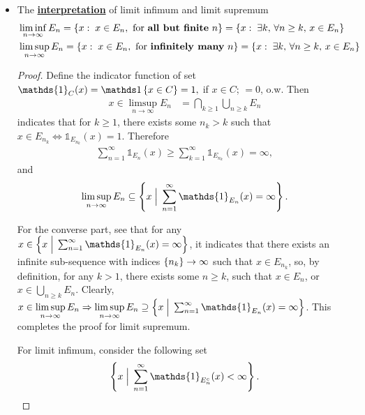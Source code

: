 \documentclass[11pt]{article}
\begin{document}
\begin{itemize}
\item \begin{proposition} The \underline{\textbf{interpretation}} of limit infimum and limit supremum
\begin{align*}
&\liminf\limits_{n\rightarrow \infty}E_{n} = \left\{x: \; x\in E_{n}, \text{ for \textbf{all but finite} }n \right\} = \left\{x: \; \exists k,\, \forall n\ge k, \, x\in E_{n} \right\}\\
&\limsup\limits_{n\rightarrow \infty}E_{n} = \left\{x: \; x\in E_{n}, \text{ for \textbf{infinitely many} }n \right\}  = \left\{x: \; \exists k,\, \forall n\ge k, \, x\in E_{n} \right\}
\end{align*}
\end{proposition}
\begin{proof}
Define the indicator function of set $\mathds{1}_{C}(x) = \ind{x\in C} = 1, $ if $x\in C$; $=0$, o.w. 
Then 
\begin{align*}
x\in \limsup\limits_{n\rightarrow \infty}E_{n} &= \bigcap_{k\ge 1}\bigcup_{n\ge k}E_{n}
\end{align*} 
indicates that for $k\ge 1$, there exists some $n_{k} > k$ such that $x\in E_{n_{k}} \Leftrightarrow  \mathds{1}_{E_{n_{k}}}(x)=1$. 
Therefore 
\begin{align*}
\sum_{n=1}^{\infty}\mathds{1}_{E_{n}}(x) \ge \sum_{k=1}^{\infty}\mathds{1}_{E_{n_{k}}}(x) = \infty,  
\end{align*} 
and 
\begin{align*}
\limsup\limits_{n\rightarrow \infty}E_{n} \subseteq \set{x\;\Big|\; \sum_{n=1}^{\infty}\mathds{1}_{E_{n}}(x)  = \infty}.
\end{align*}

For the converse part, see that for any $x \in \set{x\;\Big|\; \sum_{n=1}^{\infty}\mathds{1}_{E_{n}}(x)  = \infty}$, it indicates that there exists an infinite sub-sequence with indices $\left\{n_{k}\right\}\rightarrow \infty$ such that $x\in E_{n_{k}} $, so, by definition, for any $k>1$, there exists some $n \ge k$, such that $x\in E_{n} $, or $x\in \bigcup_{n\ge k}E_{n}$. Clearly, 
$x \in \limsup\limits_{n\rightarrow \infty}E_{n} \Rightarrow  \limsup\limits_{n\rightarrow \infty}E_{n}  \supseteq \set{x\;\Big|\; \sum_{n=1}^{\infty}\mathds{1}_{E_{n}}(x)  = \infty}$. This completes the proof for limit supremum.

For limit infimum, consider the following set
\begin{align*}
\set{x\;\Big|\; \sum_{n=1}^{\infty}\mathds{1}_{E_{n}^{c}}(x)  < \infty}.
\end{align*}


\end{proof}
\end{itemize}
\end{document}
